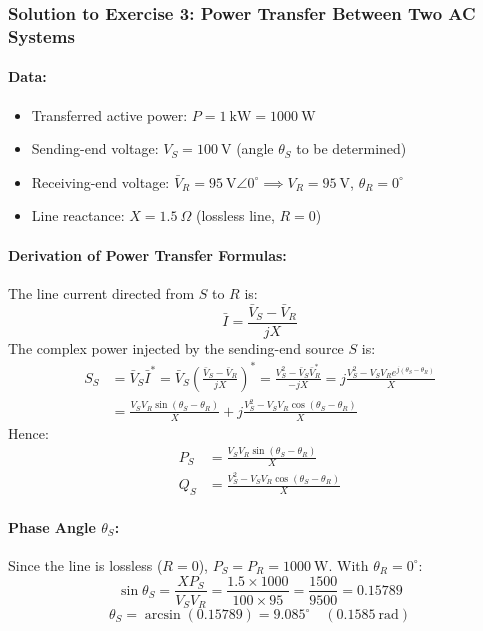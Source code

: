 \subsubsection*{Solution to Exercise 3: Power Transfer Between Two AC Systems}
\paragraph{Data:}
\begin{itemize}
    \item Transferred active power: $P = 1\ \text{kW} = 1000\ \text{W}$
    \item Sending-end voltage: $V_S = 100\ \text{V}$ (angle $\theta_S$ to be determined)
    \item Receiving-end voltage: $\bar{V}_R = 95\ \text{V}\angle 0^\circ \implies V_R = 95\ \text{V}$, $\theta_R = 0^\circ$
    \item Line reactance: $X = 1.5\ \Omega$ (lossless line, $R = 0$)
\end{itemize}

\paragraph{Derivation of Power Transfer Formulas:}
The line current directed from $S$ to $R$ is:
\begin{equation}
    \bar{I} = \frac{\bar{V}_S - \bar{V}_R}{jX}
\end{equation}
The complex power injected by the sending-end source $S$ is:
\begin{align}
    S_S &= \bar{V}_S \bar{I}^* = \bar{V}_S \left(\frac{\bar{V}_S - \bar{V}_R}{jX}\right)^* = \frac{V_S^2 - \bar{V}_S \bar{V}_R^*}{-jX} = j \frac{V_S^2 - V_S V_R e^{j(\theta_S - \theta_R)}}{X} \nonumber\\
        &= \frac{V_S V_R \sin(\theta_S - \theta_R)}{X} + j \frac{V_S^2 - V_S V_R \cos(\theta_S - \theta_R)}{X}
\end{align}
Hence:
\begin{align}
    P_S &= \frac{V_S V_R \sin(\theta_S - \theta_R)}{X} \label{eq:PS_formula}\\
    Q_S &= \frac{V_S^2 - V_S V_R \cos(\theta_S - \theta_R)}{X} \label{eq:QS_formula}
\end{align}

\paragraph{Phase Angle $\theta_S$:}
Since the line is lossless ($R = 0$), $P_S = P_R = 1000\ \text{W}$. With $\theta_R = 0^\circ$:
\begin{equation}
    \sin\theta_S = \frac{X P_S}{V_S V_R} = \frac{1.5 \times 1000}{100 \times 95} = \frac{1500}{9500} = 0.15789
\end{equation}
\begin{equation}
    \boxed{\theta_S = \arcsin(0.15789) = 9.085^\circ\quad (0.1585\ \text{rad})}
\end{equation}

